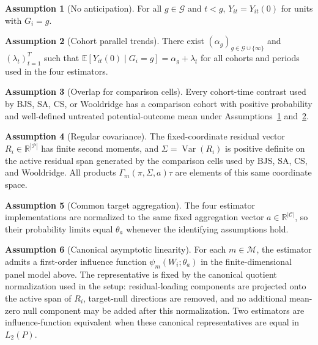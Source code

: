 \documentclass[11pt]{article}
\newcommand{\E}{\mathbb{E}}
\newcommand{\R}{\mathbb{R}}
\theoremstyle{definition}
\newtheorem{assumption}{Assumption}
\theoremstyle{plain}
\theoremstyle{remark}
\begin{document}
\begin{assumption}[No anticipation]\label{ass:no-anticipation}
For all \(g\in\mathcal G\) and \(t<g\), \(Y_{it}=Y_{it}(0)\) for units with \(G_i=g\).
\end{assumption}

\begin{assumption}[Cohort parallel trends]\label{ass:parallel}
There exist \((\alpha_g)_{g\in\mathcal G\cup\{\infty\}}\) and \((\lambda_t)_{t=1}^T\) such that
\(\E[Y_{it}(0)\mid G_i=g]=\alpha_g+\lambda_t\) for all cohorts and periods used in the four
estimators.
\end{assumption}

\begin{assumption}[Overlap for comparison cells]\label{ass:overlap}
Every cohort-time contrast used by BJS, SA, CS, or Wooldridge has a comparison cohort with positive
probability and well-defined untreated potential-outcome mean under Assumptions~\ref{ass:no-anticipation}
and~\ref{ass:parallel}.
\end{assumption}

\begin{assumption}[Regular covariance]\label{ass:regular-covariance}
The fixed-coordinate residual vector \(R_i\in\R^{|\mathcal P|}\) has finite second moments, and
\(\Sigma=\operatorname{Var}(R_i)\) is positive definite on the active residual span generated by the
comparison cells used by BJS, SA, CS, and Wooldridge.  All products
\(\Gamma_m(\pi,\Sigma,a)\tau\) are elements of this same coordinate space.
\end{assumption}

\begin{assumption}[Common target aggregation]\label{ass:common-target}
The four estimator implementations are normalized to the same fixed aggregation vector
\(a\in\R^{|\mathcal C|}\), so their probability limits equal \(\theta_a\) whenever the identifying
assumptions hold.
\end{assumption}

\begin{assumption}[Canonical asymptotic linearity]\label{ass:asym-linear}
For each \(m\in\mathcal M\), the estimator admits a first-order influence function
\(\psi_m(W_i;\theta_a)\) in the finite-dimensional panel model above.  The representative is fixed
by the canonical quotient normalization used in the setup: residual-loading components are projected
onto the active span of \(R_i\), target-null directions are removed, and no additional mean-zero null
component may be added after this normalization.  Two estimators are influence-function equivalent when
these canonical representatives are equal in \(L_2(P)\).
\end{assumption}
\end{document}
